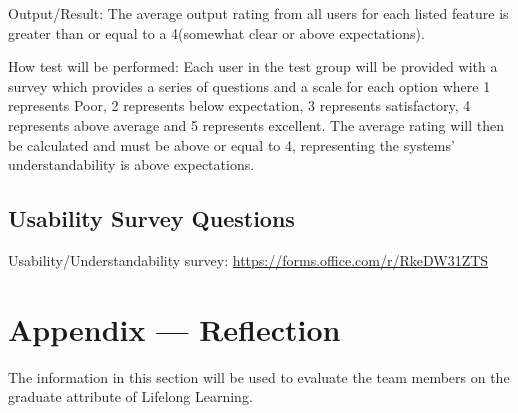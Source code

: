 \documentclass[12pt, titlepage]{article}
\begin{document}
\begin{enumerate}
  Output/Result: The average output rating from all users for each listed feature is greater than or equal to a 4(somewhat clear or above expectations).
            
  How test will be performed: Each user in the test group will be provided with a survey which provides a series of questions and a scale for each option where 1 represents Poor, 2 represents below expectation, 3 represents satisfactory, 4 represents above average and 5 represents excellent.
  The average rating will then be calculated and must be above or equal to 4, representing the systems' understandability is above expectations. 
  
  \end{enumerate}

\subsection{Usability Survey Questions}

  Usability/Understandability survey:
  \url{https://forms.office.com/r/RkeDW31ZTS}
\newpage{}
\section*{Appendix --- Reflection}

The information in this section will be used to evaluate the team members on the
graduate attribute of Lifelong Learning.


\end{document}
